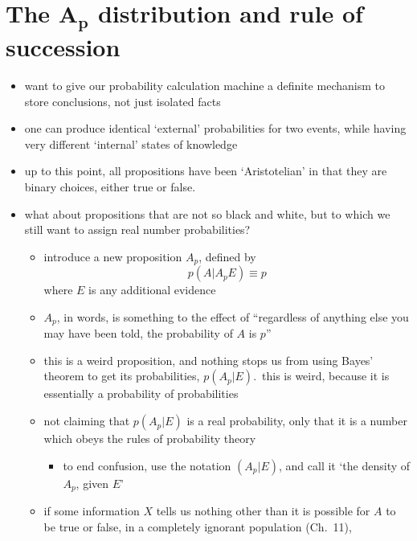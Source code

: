 \documentclass[../jaynes_prob_theory_notes.tex]{subfiles}
\begin{document}
\section{The \(\boldsymbol{A_p}\) distribution and rule of succession}
        \begin{itemize} 
            \item want to give our probability calculation machine a definite mechanism to store conclusions, not just isolated facts
            \item one can produce identical `external' probabilities for two events, while having very different `internal' states of knowledge 
            \item up to this point, all propositions have been `Aristotelian' in that they are binary choices, either true or false. 
            \item what about propositions that are not so black and white, but to which we still want to assign real number probabilities?
                \begin{itemize} 
                    \item introduce a new proposition \(A_p\), defined by
                        \begin{equation*} 
                            p(A|A_p E) \equiv p
                        \end{equation*}
                        where \(E\) is any additional evidence
                    \item \(A_p\), in words, is something to the effect of ``regardless of anything else you may have been told, the probability of \(A\) is \(p\)''
                    \item this is a weird proposition, and nothing stops us from using Bayes' theorem to get its probabilities, \(p(A_p | E)\).\ this is weird, because it is essentially a probability of probabilities
                    \item not claiming that \(p(A_p|E)\) is a real probability, only that it is a number which obeys the rules of probability theory
                        \begin{itemize} 
                            \item to end confusion, use the notation \((A_p|E)\), and call it `the density of \(A_p\), given \(E\)'
                        \end{itemize}
                    \item if some information \(X\) tells us nothing other than it is possible for \(A\) to be true or false, in a completely ignorant population (Ch.\ 11),

\end{itemize}
\end{itemize}
\end{document}
